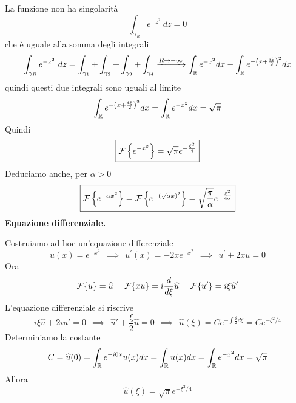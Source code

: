 La funzione non ha singolarità
\begin{equation*}
\int_{\gamma_{R}} e^{- z^{2}} \ dz = 0
\end{equation*}
che è uguale alla somma degli integrali
\begin{equation*}
\int_{\gamma_{R}} e^{- z^{2}} \ dz = \int_{\gamma_{1}} + \int_{\gamma_{2}} + \int_{\gamma_{3}} + \int_{\gamma_{4}}\xrightarrow{R\rightarrow + \infty}\int_{\mathbb{R}} e^{- x^{2}} dx - \int_{\mathbb{R}} e^{- \left(x + \frac{i\xi}{2}\right)^{2}} dx
\end{equation*}
quindi questi due integrali sono uguali al limite
\begin{equation*}
\int_{\mathbb{R}} e^{- \left(x + \frac{i\xi}{2}\right)^{2}} dx = \int_{\mathbb{R}} e^{- x^{2}} dx = \sqrt{\pi}
\end{equation*}
Quindi
\begin{equation*}
\boxed{\mathcal{F} \left\{e^{- x^{2}}\right\} = \sqrt{\pi} e^{- \frac{\xi^{2}}{4}}}
\end{equation*}
Deduciamo anche, per $\alpha > 0$
\begin{equation*}
\boxed{\mathcal{F} \left\{e^{- \alpha x^{2}}\right\} = \mathcal{F} \left\{e^{- (\sqrt{\alpha} x)^{2}}\right\} = \sqrt{\frac{\pi}{\alpha}} e^{- \frac{\xi^{2}}{4\alpha}}}
\end{equation*}
\textbf{Equazione differenziale.}

Costruiamo ad hoc un'equazione differenziale
\begin{equation*}
u(x) = e^{- x^{2}} \ \ \implies \ \ u^{'} (x) = -2xe^{- x^{2}} \ \ \implies \ \ u^{'} + 2xu = 0
\end{equation*}
Ora
\begin{equation*}
\mathcal{F} \{u\} = \widehat{u} \ \ \ \ \mathcal{F} \{xu\} = i\frac{d}{d\xi}\widehat{u} \ \ \ \ \mathcal{F} \{u'\} = i\xi \widehat{u}'
\end{equation*}
L'equazione differenziale si riscrive
\begin{equation*}
i\xi \hat{u} + 2i\hat{u}' = 0\ \ \implies \ \ \hat{u}' + \frac{\xi}{2}\hat{u} = 0\ \ \implies \ \ \hat{u}(\xi) = Ce^{- \int \frac{\xi}{2} d\xi} = Ce^{- \xi^{2} /4}
\end{equation*}
Determiniamo la costante
\begin{equation*}
C = \widehat{u}(0) = \int_{\mathbb{R}} e^{- i0x} u(x) dx = \int_{\mathbb{R}} u(x) dx = \int_{\mathbb{R}} e^{- x^{2}} dx = \sqrt{\pi}
\end{equation*}
Allora
\begin{equation*}
\boxed{\hat{u}(\xi) = \sqrt{\pi} e^{- \xi^{2} /4}}
\end{equation*}

